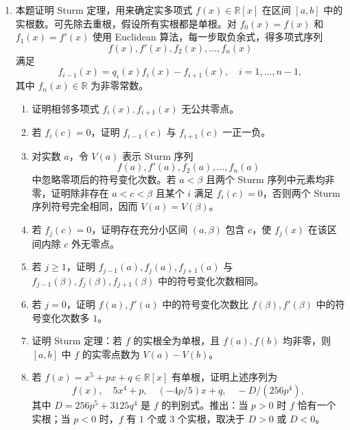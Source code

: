 \begin{enumerate}[label=\arabic*.]
	\begin{enumerate}[label=(\alph*)]
		\item 证明 $f$ 的 Galois 群为 $A_3$ 当且仅当二次多项式
		\[
		g(x)=x^2+(ab-3c)x+(b^3+a^3c-6abc+9c^2)
		\]
		在 $K$ 中有根。若 $\alpha,\beta,\gamma$ 是 $f$ 的根，证明 Galois 群为 $A_3$ 当且仅当
		\[
		\theta=\alpha\beta^2+\beta\gamma^2+\gamma\alpha^2
		\]
		属于 $K$，且 $\theta$ 是 $g(x)$ 的根。证明 $g(x)$ 的判别式等于 $f(x)$ 的判别式。
		\item 若 $\operatorname{ch}(K)\ne2$，证明 $f(x)$ 的 Galois 群为 $A_3$ 当且仅当 $f(x)$ 的判别式是 $K$ 中平方。
		\item 若 $\operatorname{ch}(K)=2$，证明 $f(x)$ 的判别式总是平方。证明可取 $f(x)$ 为 $x^3+px+q$ 的形式，且 $f(x)$ 的 Galois 群为 $A_3$ 当且仅当二次式
		\[
		x^2+qx+(p^3+q^2)
		\]
		在 $K$ 中有根；等价地，$(p^3+q^2)/q^2$ 属于 Artin-Schreier 映射 $x\mapsto x^2-x$ 的像。
		\item 若 $K=\mathbb F_2(t)$，其中 $t$ 在 $\mathbb F_2$ 上超越，证明
		\[
		x^3+t^2x+t^3,
		\quad x^3+(t^2+t+1)x+(t^2+t+1),
		\]
		\[
		x^3+(t^2+t+1)x+(t^3+t^2+t)
		\]
		的 Galois 群为 $A_3$，而 $x^3+t^2x+t$ 与 $x^3+x+t$ 的 Galois 群为 $S_3$。
	\end{enumerate}
	\item 本题证明 Sturm 定理，用来确定实多项式 $f(x)\in\mathbb R[x]$ 在区间 $[a,b]$ 中的实根数。可先除去重根，假设所有实根都是单根。对 $f_0(x)=f(x)$ 和 $f_1(x)=f'(x)$ 使用 Euclidean 算法，每一步取负余式，得多项式序列
	\[
	f(x),f'(x),f_2(x),\ldots,f_n(x)
	\]
	满足
	\[
	f_{i-1}(x)=q_i(x)f_i(x)-f_{i+1}(x),
	\quad i=1,
	\ldots,n-1,
	\]
	其中 $f_n(x)\in\mathbb R$ 为非零常数。
	\begin{enumerate}[label=(\alph*)]
		\item 证明相邻多项式 $f_i(x),f_{i+1}(x)$ 无公共零点。
		\item 若 $f_i(c)=0$，证明 $f_{i-1}(c)$ 与 $f_{i+1}(c)$ 一正一负。
		\item 对实数 $a$，令 $V(a)$ 表示 Sturm 序列
		\[
		f(a),f'(a),f_2(a),\ldots,f_n(a)
		\]
		中忽略零项后的符号变化次数。若 $a<\beta$ 且两个 Sturm 序列中元素均非零，证明除非存在 $a<c<\beta$ 且某个 $i$ 满足 $f_i(c)=0$，否则两个 Sturm 序列符号完全相同，因而 $V(a)=V(\beta)$。
		\item 若 $f_j(c)=0$，证明存在充分小区间 $(a,\beta)$ 包含 $c$，使 $f_j(x)$ 在该区间内除 $c$ 外无零点。
		\item 若 $j\ge1$，证明 $f_{j-1}(a),f_j(a),f_{j+1}(a)$ 与 $f_{j-1}(\beta),f_j(\beta),f_{j+1}(\beta)$ 中的符号变化次数相同。
		\item 若 $j=0$，证明 $f(a),f'(a)$ 中的符号变化次数比 $f(\beta),f'(\beta)$ 中的符号变化次数多 $1$。
		\item 证明 Sturm 定理：若 $f$ 的实根全为单根，且 $f(a),f(b)$ 均非零，则 $[a,b]$ 中 $f$ 的实零点数为 $V(a)-V(b)$。
		\item 若 $f(x)=x^5+px+q\in\mathbb R[x]$ 有单根，证明上述序列为
		\[
		f(x),\quad 5x^4+p,
		\quad (-4p/5)x+q,
		\quad -D/(256p^4),
		\]
		其中 $D=256p^5+3125q^4$ 是 $f$ 的判别式。推出：当 $p>0$ 时 $f$ 恰有一个实根；当 $p<0$ 时，$f$ 有 $1$ 个或 $3$ 个实根，取决于 $D>0$ 或 $D<0$。
	\end{enumerate}
\end{enumerate}

